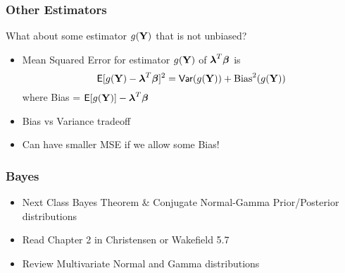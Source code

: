 \documentclass[handout]{beamer}\usepackage[]{graphicx}\usepackage[]{color}
\begin{document}
\begin{frame} \frametitle{Other Estimators}
What about some estimator $g(\mathbf{Y})$ that is not unbiased? \pause
  \begin{itemize}
\item Mean Squared Error for estimator $g(\mathbf{Y})$ of $\boldsymbol{\lambda}^T\boldsymbol{\beta}$ is
$$\textsf{E}[g(\mathbf{Y}) - \boldsymbol{\lambda}^T\boldsymbol{\beta}]^2 = \textsf{Var}(g(\mathbf{Y})) + \text{Bias}^2(g(\mathbf{Y}))$$
where Bias = $\textsf{E}[g(\mathbf{Y})] - \boldsymbol{\lambda}^T\boldsymbol{\beta}$  \pause
\item Bias vs Variance tradeoff \pause
\item Can have smaller MSE if we allow some Bias!
\end{itemize}
\end{frame}

\begin{frame}\frametitle{Bayes}
  \begin{itemize}
  \item  Next Class Bayes Theorem \& Conjugate Normal-Gamma Prior/Posterior   distributions
  \item  Read   Chapter 2 in Christensen or Wakefield 5.7
  \item  Review Multivariate Normal and Gamma distributions
  \end{itemize}





\end{frame}
\end{document}
